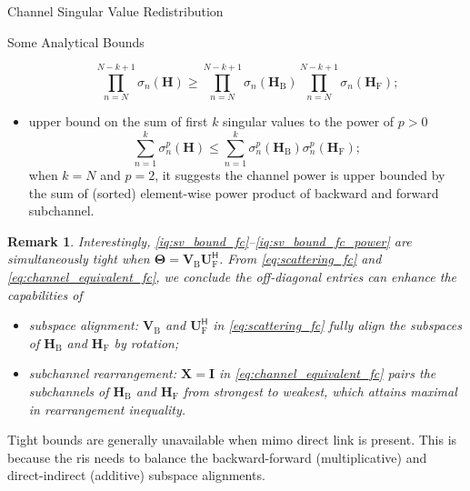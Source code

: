 \documentclass[journal]{IEEEtran}
\newtheorem{remark}{Remark}
\begin{document}
\begin{section}{Channel Singular Value Redistribution}
\begin{subsection}{Some Analytical Bounds}
\begin{itemize}
			\begin{equation}
				\prod_{n=N}^{N-k+1} \sigma_n(\mathbf{H}) \ge \prod_{n=N}^{N-k+1} \sigma_n(\mathbf{H}_\mathrm{B}) \prod_{n=N}^{N-k+1} \sigma_n(\mathbf{H}_\mathrm{F});
			\end{equation}
			\item upper bound on the sum of first $k$ singular values to the power of $p > 0$
			\begin{equation}
				\sum_{n=1}^k \sigma_n^p(\mathbf{H}) \le \sum_{n=1}^k \sigma_n^p(\mathbf{H}_\mathrm{B}) \sigma_n^p(\mathbf{H}_\mathrm{F});
				\label{iq:sv_bound_fc_power}
			\end{equation}
			when $k = N$ and $p = 2$, it suggests the channel power is upper bounded by the sum of (sorted) element-wise power product of backward and forward subchannel.
		\end{itemize}

		\begin{remark}
			Interestingly, \eqref{iq:sv_bound_fc}--\eqref{iq:sv_bound_fc_power} are simultaneously tight when $\mathbf{\Theta} = \mathbf{V}_\mathrm{B} \mathbf{U}_\mathrm{F}^\mathsf{H}$.
			From \eqref{eq:scattering_fc} and \eqref{eq:channel_equivalent_fc}, we conclude the off-diagonal entries can enhance the capabilities of
			\begin{itemize}
				\item subspace alignment: $\mathbf{V}_\mathrm{B}$ and $\mathbf{U}_\mathrm{F}^\mathsf{H}$ in \eqref{eq:scattering_fc} fully align the subspaces of $\mathbf{H}_\mathrm{B}$ and $\mathbf{H}_\mathrm{F}$ by rotation;
				\item subchannel rearrangement: $\mathbf{X} = \mathbf{I}$ in \eqref{eq:channel_equivalent_fc} pairs the subchannels of $\mathbf{H}_\mathrm{B}$ and $\mathbf{H}_\mathrm{F}$ from strongest to weakest, which attains maximal in rearrangement inequality.
			\end{itemize}
		\end{remark}

		Tight bounds are generally unavailable when \gls{mimo} direct link is present.
		This is because the \gls{ris} needs to balance the backward-forward (multiplicative) and direct-indirect (additive) subspace alignments.



\end{subsection}
\end{section}
\end{document}

